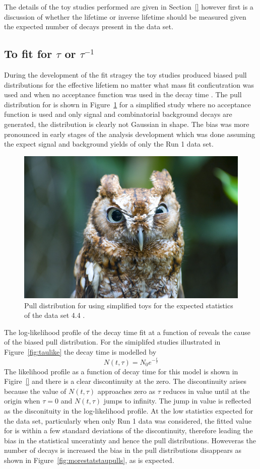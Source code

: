 { The details of the toy studies performed are given in Section~\ref{} however first is a discussion of whether the \bsmumu lifetime or inverse lifetime should be measured given the expected number of decays present in the data set.  

\subsection{To fit for $\tau$ or $\tau^{-1}$}
\label{sec:tauORinvtau}
During the development of the fit stragey the toy studies produced biased pull distributions for the \bsmumu effective lifetiem no matter what mass fit conficutration was used and when no acceptance function was used in the decay time \pdfs. The pull distribution for \tmumu is shown in Figure~\ref{fig:taupulls} for a simplified study where no acceptance function is used and only signal and combinatorial background decays are generated, the distribution is clearly not Gaussian in shape. The bias was more pronounced in early stages of the analysis development which was done assuming the expect signal and background yields of only the Run 1 data set. 

\begin{figure}[htbp]
    \centering
        \includegraphics[width= 0.6 \textwidth]{./Figs/placeholder.jpeg}  
    \caption{Pull distribution for \tmumu using simplified toys for the expected statistics of the data set 4.4 \fb.}
    \label{fig:taupulls}
\end{figure}

The log-likelihood profile of the decay time fit at a function of \tmumu reveals the cause of the biased pull distribution. For the simiplifed studies illustrated in Figure~\ref{fig:taulike} the decay time is modelled by
\begin{equation}
N(t, \tau) = N_{0}e^{-\frac{t}{\tau}}
\end{equation}
The likelihood profile as a function of decay time for this model is shown in Figire~\ref{} and there is a clear discontinuity at the zero. The discontinuity arises because the value of $N(t, \tau)$ approaches zero as $\tau$ reduces in value until at the origin when $\tau = 0$ and $N(t, \tau)$ jumps to infinity. The jump in value is reflected as the disconituity in the log-likelihood profile. At the low statistics expected for the data set, particularly when only Run 1 data was considered, the fitted value for \tmumu is within a few standard deviations of the discontinuity, therefore leading the bias in the statistical unceratinty and hence the pull distributions. Howeveras the number of \bsmumu decays is increased the bias in the \tmumu pull distributions disappears as shown in Figure~\ref{fig:morestatstaupulls}, as is expected.


}
